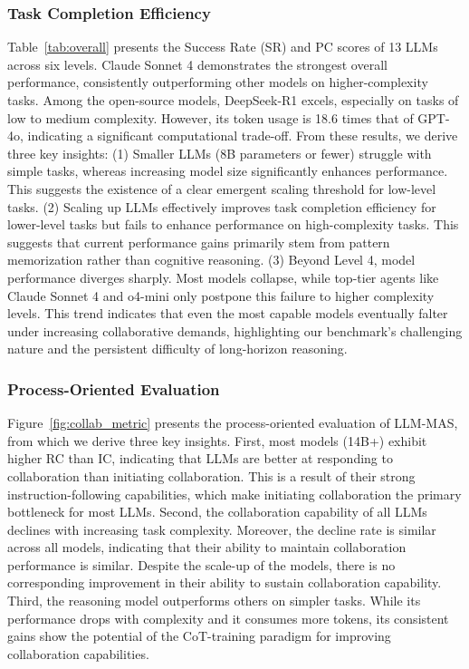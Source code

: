 \documentclass[11pt]{article}
\begin{document}
\subsubsection{Task Completion Efficiency}

Table~\ref{tab:overall} presents the Success Rate (SR) and PC scores of 13 LLMs across six levels. Claude Sonnet 4 demonstrates the strongest overall performance, consistently outperforming other models on higher-complexity tasks. Among the open-source models, DeepSeek-R1 excels, especially on tasks of low to medium complexity. However, its token usage is 18.6 times that of GPT-4o, indicating a significant computational trade-off. From these results, we derive three key insights: (1) Smaller LLMs (8B parameters or fewer) struggle with simple tasks, whereas increasing model size significantly enhances performance. This suggests the existence of a clear emergent scaling threshold for low-level tasks. (2) Scaling up LLMs effectively improves task completion efficiency for lower-level tasks but fails to enhance performance on high-complexity tasks. This suggests that current performance gains primarily stem from pattern memorization rather than cognitive reasoning. (3) Beyond Level 4, model performance diverges sharply. Most models collapse, while top-tier agents like Claude Sonnet 4 and o4-mini only postpone this failure to higher complexity levels. This trend indicates that even the most capable models eventually falter under increasing collaborative demands, highlighting our benchmark's challenging nature and the persistent difficulty of long-horizon reasoning.



\subsubsection{Process-Oriented Evaluation}

Figure~\ref{fig:collab_metric} presents the process-oriented evaluation of LLM-MAS, from which we derive three key insights. First, most models (14B+) exhibit higher RC than IC, indicating that LLMs are better at responding to collaboration than initiating collaboration. This is a result of their strong instruction-following capabilities, which make initiating collaboration the primary bottleneck for most LLMs. Second, the collaboration capability of all LLMs declines with increasing task complexity. Moreover, the decline rate is similar across all models, indicating that their ability to maintain collaboration performance is similar. Despite the scale-up of the models, there is no corresponding improvement in their ability to sustain collaboration capability. Third, the reasoning model outperforms others on simpler tasks. While its performance drops with complexity and it consumes more tokens, its consistent gains show the potential of the CoT-training paradigm for improving collaboration capabilities.
\end{document}
